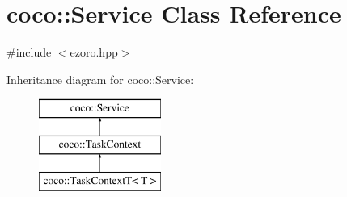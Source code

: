 \hypertarget{classcoco_1_1_service}{\section{coco\-:\-:Service Class Reference}
\label{classcoco_1_1_service}
}


{\ttfamily \#include $<$ezoro.\-hpp$>$}

Inheritance diagram for coco\-:\-:Service\-:\begin{figure}[H]
\begin{center}
\leavevmode
\includegraphics[height=3.000000cm]{classcoco_1_1_service}
\end{center}
\end{figure}
